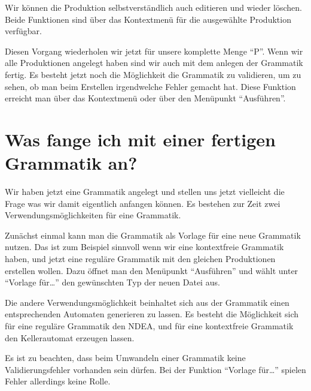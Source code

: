 Wir können die Produktion selbstverständlich auch editieren und wieder löschen.
Beide Funktionen sind über das Kontextmenü für die ausgewählte Produktion
verfügbar.\vspace{10pt}

Diesen Vorgang wiederholen wir jetzt für unsere komplette Menge "`P"'. Wenn wir
alle Produktionen angelegt haben sind wir auch mit dem anlegen der Grammatik
fertig. Es besteht jetzt noch die Möglichkeit die Grammatik zu validieren, um
zu sehen, ob man beim Erstellen irgendwelche Fehler gemacht hat. Diese Funktion
erreicht man über das Kontextmenü oder über den Menüpunkt "`Ausführen"'.

\section{Was fange ich mit einer fertigen Grammatik an?}

Wir haben jetzt eine Grammatik angelegt und stellen uns jetzt vielleicht die
Frage was wir damit eigentlich anfangen können. Es bestehen zur Zeit zwei
Verwendungsmöglichkeiten für eine Grammatik.\vspace{10pt}

Zunächst einmal kann man die Grammatik als Vorlage für eine neue Grammatik
nutzen. Das ist zum Beispiel sinnvoll wenn wir eine kontextfreie Grammatik
haben, und jetzt eine reguläre Grammatik mit den gleichen Produktionen
erstellen wollen. Dazu öffnet man den Menüpunkt "`Ausführen"' und wählt unter
"`Vorlage für\ldots"' den gewünschten Typ der neuen Datei aus.\vspace{10pt}

Die andere Verwendungsmöglichkeit beinhaltet sich aus der Grammatik einen
ent\-sprechen\-den Automaten generieren zu lassen. Es besteht die Möglichkeit
sich für eine reguläre Grammatik den NDEA, und für eine kontextfreie Grammatik den Kellerautomat
erzeugen lassen.\vspace{10pt}

Es ist zu beachten, dass beim Umwandeln einer Grammatik keine
Validierungsfehler vorhanden sein dürfen. Bei der Funktion "`Vorlage
für\ldots"' spielen Fehler allerdings keine Rolle.




